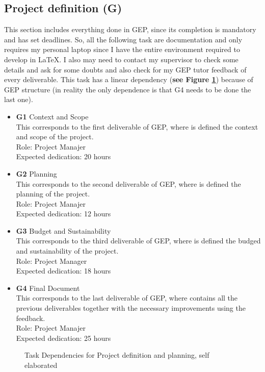 \subsection{Project definition \textbf{(G)} }
This section includes everything done in GEP, since its completion is mandatory and has set deadlines.
So, all the following task are documentation and only requires my personal laptop since I have the entire environment required to develop in \LaTeX.
I also may need to contact my supervisor to check some details and ask for some doubts and also check for my GEP tutor feedback of every deliverable.
This task has a linear dependency (\textbf{see Figure \ref{G_dependences}}) because of GEP structure (in reality the only dependence is that G4 needs to be done the last one).
\begin{itemize}
    \item \textbf{G1} Context and Scope \\
        This corresponds to the first deliverable of GEP, where is defined the context and scope of the project. \\
        Role: Project Manajer \\
        Expected dedication: 20 hours
    \item \textbf{G2} Planning \\
        This corresponds to the second deliverable of GEP, where is defined the planning of the project. \\
        Role: Project Manajer \\
        Expected dedication: 12 hours
    \item \textbf{G3} Budget and Sustainability \\
        This corresponds to the third deliverable of GEP, where is defined the budged and sustainability of the project. \\
        Role: Project Manager \\
        Expected dedication: 18 hours 
    \item \textbf{G4} Final Document \\
        This corresponds to the last deliverable of GEP, where contains all the previous deliverables together with the necessary improvements using the feedback. \\
        Role: Project Manajer \\
        Expected dedication: 25 hours
\end{itemize}
\begin{figure}[h]
    \centering
    \caption{Task Dependencies for Project definition and planning, self elaborated}
    \label{G_dependences}
\end{figure}

